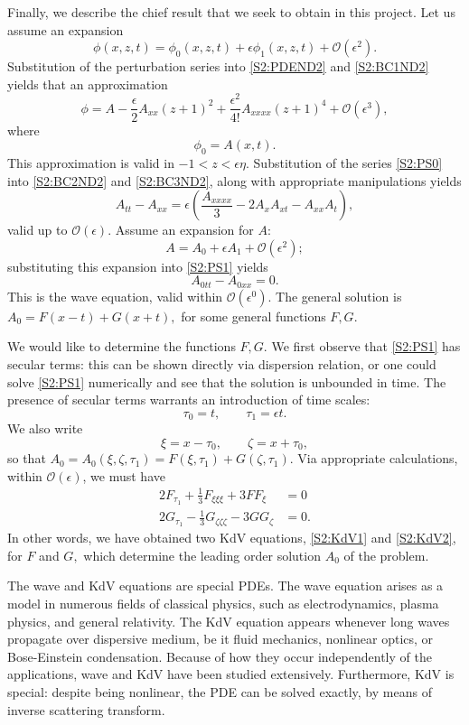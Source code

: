 \documentclass[11pt,reqno,oneside,a4paper]{article}
\begin{document}
Finally, we describe the chief result that we seek to obtain in this project. Let us assume an expansion
\[ \phi(x,z,t) = \phi_0(x,z,t) + \epsilon \phi_1(x,z,t) + \mathcal{O}(\epsilon^2).\]
Substitution of the perturbation series into \eqref{S2:PDEND2} and \eqref{S2:BC1ND2} yields that an approximation
\begin{equation}\label{S2:PS0}
\phi = A - \frac{\epsilon}{2} A_{xx}(z+1)^2 + \frac{\epsilon^2}{4!} A_{xxxx} (z+1)^4 + \mathcal{O}(\epsilon^3),
\end{equation}
where
\[ \phi_0 = A(x,t).\]
This approximation is valid in $-1<z<\epsilon \eta.$ Substitution of the series \eqref{S2:PS0} into \eqref{S2:BC2ND2} and \eqref{S2:BC3ND2}, along with appropriate manipulations yields
\begin{equation}\label{S2:PS1}
A_{tt} - A_{xx} = \epsilon\left( \frac{A_{xxxx}}{3} - 2A_x A_{xt} - A_{xx}A_t\right),
\end{equation}
valid up to $\mathcal{O}(\epsilon).$ Assume an expansion for $A:$ 
\[ A = A_0 + \epsilon A_1 + \mathcal{O}(\epsilon^2);\]
substituting this expansion into \eqref{S2:PS1} yields
\begin{equation}\label{S2:W1}
 A_{0tt} - A_{0xx} = 0.
\end{equation}
This is the wave equation, valid within $\mathcal{O}(\epsilon^0).$ The general solution is $A_0 = F(x-t) + G(x+t),$ for some general functions $F,G.$

We would like to determine the functions $F,G.$ We first observe that \eqref{S2:PS1} has secular terms: this can be shown directly via dispersion relation, or one could solve \eqref{S2:PS1} numerically and see that the solution is unbounded in time. The presence of secular terms warrants an introduction of time scales:
\[ \tau_0 = t, \qquad \tau_1 = \epsilon t.\]
We also write 
\[ 
\xi = x- \tau_0, \qquad \zeta = x + \tau_0,
\]
so that $A_0 = A_0(\xi, \zeta, \tau_1) = F(\xi, \tau_1) + G(\zeta, \tau_1).$ Via appropriate calculations, within $\mathcal{O}(\epsilon)$, we must have 
\begin{align}
2F_{\tau_1} + \frac{1}{3}F_{\xi\xi\xi} + 3 F F_\xi &= 0 \label{S2:KdV1} \\
2G_{\tau_1} - \frac{1}{3}G_{\zeta\zeta\zeta} -  3 G G_\zeta &= 0. \label{S2:KdV2}
\end{align}
In other words, we have obtained two KdV equations, \eqref{S2:KdV1} and \eqref{S2:KdV2}, for $F$ and $G,$ which determine the leading order solution $A_0$ of the problem. 

The wave and KdV equations are special PDEs. The wave equation arises as a model in numerous fields of classical physics, such as electrodynamics, plasma physics, and general relativity. The KdV equation appears whenever long waves propagate over dispersive medium, be it fluid mechanics, nonlinear optics, or Bose-Einstein condensation. Because of how they occur independently of the applications, wave and KdV have been studied extensively. Furthermore, KdV is special: despite being nonlinear, the PDE can be solved exactly, by means of inverse scattering transform. 
\end{document}
